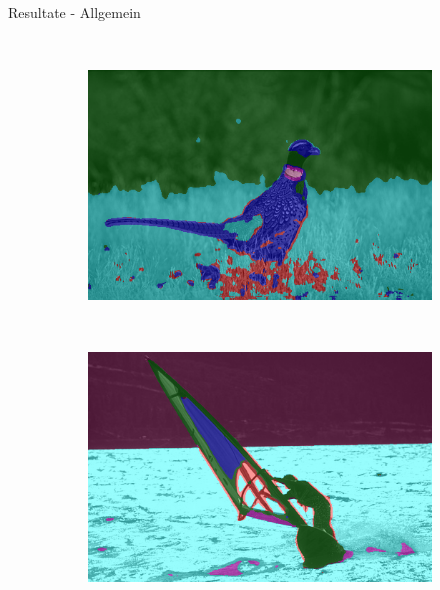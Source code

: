 \documentclass{beamer}
\begin{document}
\begin{frame}{Resultate - Allgemein}
\begin{minipage}{0.28\textwidth}
\begin{figure}[h!]
\begin{subfigure}{\textwidth}
			\end{subfigure}\\
			\begin{subfigure}{\textwidth}
				\includegraphics[width=\linewidth,keepaspectratio]{gfx/43074.jpg_seg.png}
			\end{subfigure}\\
			\begin{subfigure}{\textwidth}
				\includegraphics[width=\linewidth,keepaspectratio]{gfx/62096.jpg_seg.png}
			\end{subfigure}\\
		\end{figure}
	\end{minipage}
\end{frame}
\end{document}
